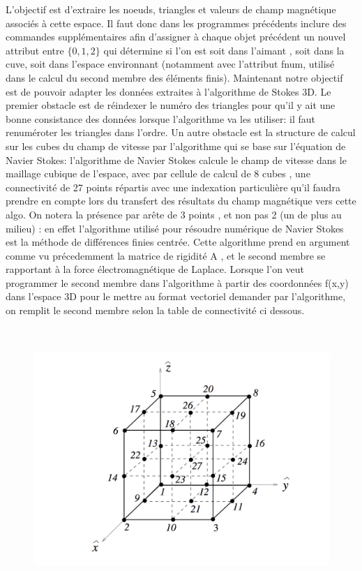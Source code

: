 \documentclass[a4paper,12pt,titlepage]{report}
\begin{document}
\begin{onehalfspace}
L'objectif est d'extraire les noeuds, triangles et valeurs de champ magnétique associés à cette espace. Il faut donc dans les programmes précédents inclure des commandes supplémentaires afin d'assigner à chaque objet précédent un nouvel attribut entre  $\{0,1,2\}$ qui détermine si l'on est soit dans l'aimant , soit dans la cuve, soit dans l'espace environnant (notamment avec l'attribut fnum, utilisé dans le calcul du second membre des éléments finis). 
\newline
Maintenant  notre objectif est de pouvoir adapter les données extraites à l'algorithme de Stokes 3D. Le premier obstacle est de réindexer le numéro des triangles pour qu'il y ait une bonne consistance des données lorsque l'algorithme va les utiliser: il faut renuméroter les triangles dans l'ordre. 
\newline 
\newline
Un autre obstacle est la structure de calcul sur les cubes du champ de vitesse par l'algorithme qui se base sur l'équation de Navier Stokes: 
\newline
l'algorithme de Navier Stokes calcule le champ de vitesse dans le maillage cubique de l'espace, avec par cellule de calcul de 8 cubes , une connectivité de 27 points répartis avec une indexation particulière qu'il faudra prendre en compte lors du transfert des résultats du champ magnétique vers cette algo. On notera la présence par arête de 3 points , et non pas 2 (un de plus au milieu) : en effet l'algorithme utilisé pour résoudre numérique de Navier Stokes est  la méthode de différences finies centrée.
\newline
Cette algorithme prend en argument comme vu précedemment la matrice de rigidité A  , et le second membre se rapportant à la force électromagnétique de Laplace. Lorsque l'on veut programmer le second membre dans l'algorithme à partir des coordonnées f(x,y) dans l'espace 3D pour le mettre au format vectoriel demander par l'algorithme, on remplit le second membre selon la table de connectivité ci dessous.
\begin{figure}[!h]
\includegraphics[height = 10cm, keepaspectratio]{graphes/table_de_connectivite.png} 

\end{figure}
\end{onehalfspace}
\end{document}

